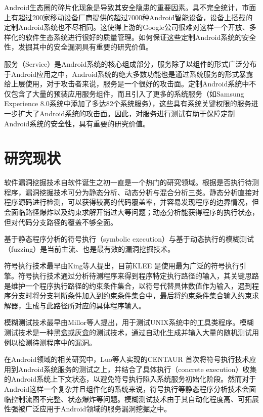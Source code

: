 \documentclass[winfonts,master,twoside]{njuthesis}
\begin{document}
Android生态圈的碎片化现象是导致其安全隐患的重要因素。具不完全统计，市面上有超过200家移动设备厂商提供的超过7000种Android智能设备\cite{android-brands}，设备上搭载的定制Android系统也不尽相同。这使得上游的Google公司很难对这样一个开放、多样化的软件生态系统进行很好的质量管理。如何保证这些定制Android系统的安全性，发掘其中的安全漏洞具有重要的研究价值。

服务（Service）是Android系统的核心组成部分，服务除了以组件的形式广泛分布于Android应用之中，Android系统的绝大多数功能也是通过系统服务的形式暴露给上层使用，对于攻击者来说，服务是一个很好的攻击面。定制Android系统中不仅包含了大量的预装应用服务组件，而且引入了更多的系统服务（如Samsung Experience 8.0系统中添加了多达82个系统服务\cite{iannillo2017chizpurfle}），这些具有系统关键权限的服务进一步扩大了Android系统的攻击面。因此，对服务进行测试有助于保障定制Android系统的安全性，具有重要的研究价值。

\section{研究现状}\label{subsec:mptcp_conges}

软件漏洞挖掘技术自软件诞生之初一直是一个热门的研究领域。根据是否执行待测程序，漏洞挖掘技术可分为静态分析、动态分析与混合分析三类\cite{ji2018coming}。静态分析直接对程序源码进行检测，可以获得较高的代码覆盖率，并容易发现程序的边界情况，但会面临路径爆炸以及约束求解开销过大等问题；动态分析能获得程序的执行状态，但对代码分支路径的覆盖不够全面。

基于静态程序分析的符号执行（symbolic execution）与基于动态执行的模糊测试（fuzzing）是当前主流、也是最有效的漏洞挖掘技术。

符号执行技术最早由King等人提出\cite{king1976symbolic}，目前KLEE \cite{cadar2008klee}是使用最为广泛的符号执行引擎。符号执行技术通过分析待测程序来得到程序特定执行路径的输入，其关键思路是维护一个程序执行路径的约束条件集合，以符号代替具体数值作为输入，遇到程序分支时将分支判断条件加入到约束条件集合中，最后将约束条件集合输入约束求解器，生成与此路径所对应的具体程序输入。

模糊测试技术最早由Millor等人提出，用于测试UNIX系统中的工具类程序\cite{miller1990empirical}。模糊测试技术是一种黑盒或灰盒的测试技术，通过自动化生成并输入大量的随机测试用例以检测待测程序中的漏洞。

在Android领域的相关研究中，Luo等人实现的CENTAUR \cite{luo2016context}首次将符号执行技术应用到Android系统服务的测试之上，并结合了具体执行（concrete execution）收集的Android系统上下文状态，以避免符号执行陷入系统服务初始化阶段。然而对于Android这样一个复杂并且组件化的系统来说，符号执行等静态程序分析技术会面临控制流图不完整、状态爆炸等问题。模糊测试技术由于其自动化程度高、可拓展性强被广泛应用于Android领域的服务漏洞挖掘之中。
\end{document}
